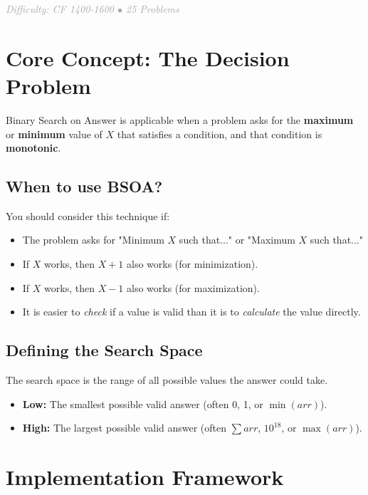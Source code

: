 \documentclass[11pt,a4paper,oneside]{book}
\begin{document}
\vspace{0.5cm}

\begin{center}
\textit{\textcolor{darkgray}{Difficulty: CF 1400-1600 $\bullet$ 25 Problems}}
\end{center}

\section{Core Concept: The Decision Problem}

Binary Search on Answer is applicable when a problem asks for the \textbf{maximum} or \textbf{minimum} value of $X$ that satisfies a condition, and that condition is \textbf{monotonic}. 

\subsection{When to use BSOA?}
You should consider this technique if:
\begin{itemize}
    \item The problem asks for "Minimum $X$ such that..." or "Maximum $X$ such that..."
    \item If $X$ works, then $X+1$ also works (for minimization).
    \item If $X$ works, then $X-1$ also works (for maximization).
    \item It is easier to \textit{check} if a value is valid than it is to \textit{calculate} the value directly.
\end{itemize}

\subsection{Defining the Search Space}
The search space is the range of all possible values the answer could take. 
\begin{itemize}
    \item \textbf{Low:} The smallest possible valid answer (often 0, 1, or $\min(arr)$).
    \item \textbf{High:} The largest possible valid answer (often $\sum arr$, $10^{18}$, or $\max(arr)$).
\end{itemize}


\section{Implementation Framework}
\end{document}

